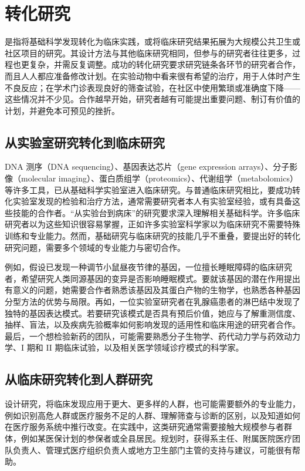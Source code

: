 \section{转化研究}
是指将基础科学发现转化为临床实践，或将临床研究结果拓展为大规模公共卫生或社区项目的研究。其设计方法与其他临床研究相同，但参与的研究者往往更多，过程也更复杂，并需反复调整。成功的转化研究要求研究链条各环节的研究者合作，而且人人都应准备修改计划。在实验动物中看来很有希望的治疗，用于人体时产生不良反应；在学术门诊表现良好的筛查试验，在社区中使用繁琐或准确度下降——这些情况并不少见。合作越早开始，研究者越有可能提出重要问题、制订有价值的计划，并避免本可预见的挫折。

\subsection{从实验室研究转化到临床研究}
DNA 测序（DNA sequencing）、基因表达芯片（gene expression arrays）、分子影像（molecular imaging）、蛋白质组学（proteomics）、代谢组学（metabolomics）等许多工具，已从基础科学实验室进入临床研究。与普通临床研究相比，要成功转化实验室发现的检验和治疗方法，通常需要研究者本人有实验室经验，或有具备这些技能的合作者。“从实验台到病床”的研究要求深入理解相关基础科学。许多临床研究者以为这些知识很容易掌握，正如许多实验室科学家以为临床研究不需要特殊训练和专业能力。然而，基础研究与临床研究的技能几乎不重叠，要提出好的转化研究问题，需要多个领域的专业能力与密切合作。

例如，假设已发现一种调节小鼠昼夜节律的基因，一位擅长睡眠障碍的临床研究者，希望研究人类同源基因的变异是否影响睡眠模式。要就该基因的潜在作用提出有意义的问题，她需要合作者熟悉该基因及其蛋白产物的生物学，也熟悉各种基因分型方法的优势与局限。再如，一位实验室研究者在乳腺癌患者的淋巴结中发现了独特的基因表达模式。若要研究该模式是否具有预后价值，她应与了解重测信度、抽样、盲法，以及疾病先验概率如何影响发现的适用性和临床用途的研究者合作。最后，一个想检验新药的团队，可能需要熟悉分子生物学、药代动力学与药效动力学、I 期和 II 期临床试验，以及相关医学领域诊疗模式的科学家。

\subsection{从临床研究转化到人群研究}
设计研究，将临床发现应用于更大、更多样的人群，也可能需要额外的专业能力，例如识别高危人群或医疗服务不足的人群、理解筛查与诊断的区别，以及知道如何在医疗服务系统中推行改变。在实践中，这类研究通常需要接触大规模参与者群体，例如某医保计划的参保者或全县居民。规划时，获得系主任、附属医院医疗团队负责人、管理式医疗组织负责人或地方卫生部门主管的支持与建议，可能很有帮助。

